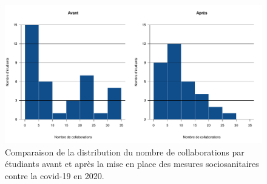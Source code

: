 \documentclass{article}
\begin{document}
\begin{figure}[h]
\centering
\includegraphics[width=\textwidth]{figure_avant_apres_covid.pdf}
\caption{Comparaison de la distribution du nombre de collaborations par étudiants avant et après la mise en place des mesures sociosanitaires contre la covid-19 en 2020.}
\label{fig:h}
\end{figure}

\clearpage


\end{document}
